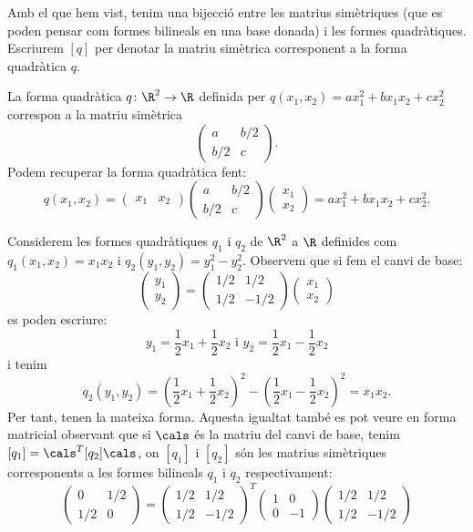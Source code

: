\begin{observacio}
Amb el que hem vist, tenim una bijecció entre les matrius simètriques (que es poden pensar com formes bilineals en una base donada) i les formes quadràtiques. Escriurem $[q]$ per denotar la matriu simètrica corresponent a la forma quadràtica $q$.
\end{observacio}
\begin{exemple}
La forma quadràtica $q\colon \R^2 \to \R$ definida per $q(x_1,x_2)=ax_1^2+bx_1x_2+cx_2^2$ correspon a la matriu simètrica
\[
\begin{pmatrix}
a & b/2 \\ b/2 & c
\end{pmatrix} .
\]
Podem recuperar la forma quadràtica fent:
\[
q(x_1,x_2)=\begin{pmatrix} x_1 & x_2 \end{pmatrix}\begin{pmatrix}
a & b/2 \\ b/2 & c
\end{pmatrix} \begin{pmatrix} x_1 \\ x_2 \end{pmatrix}=ax_1^2 + bx_1x_2+cx_2^2 .
\]
\end{exemple}
\begin{exemple}
Considerem les formes quadràtiques $q_1$ i $q_2$ de $\R^2$ a $\R$ definides com $q_1(x_1,x_2)=x_1x_2$ i $q_2(y_1,y_2)=y_1^2-y_2^2$. Observem que si fem el canvi de base:
\[
\begin{pmatrix} y_1 \\ y_2  \end{pmatrix} =
\begin{pmatrix} 1/2 & 1/2 \\ 1/2 & -1/2 \end{pmatrix}
\begin{pmatrix} x_1 \\ x_2  \end{pmatrix}
\]
es poden escriure:
\[
y_1=\frac12x_1+\frac12x_2 \text{ i } y_2=\frac12x_1-\frac12x_2 
\]
i tenim
\[
q_2(y_1,y_2)=(\frac12x_1+\frac12x_2)^2 - (\frac12x_1-\frac12x_2)^2=x_1x_2 .
\]
Per tant, tenen la mateixa forma. Aquesta igualtat també es pot veure en forma matricial observant que si $\cals$ és la matriu del canvi de base, tenim $[q_1]=\cals^T [q_2] \cals$, on $[q_1]$ i $[q_2]$ són les matrius simètriques corresponents a les formes bilineals $q_1$ i $q_2$ respectivament:
\[
\begin{pmatrix} 0 & 1/2 \\ 1/2 & 0 \end{pmatrix}=
\begin{pmatrix} 1/2 & 1/2 \\ 1/2 & -1/2 \end{pmatrix}^T
\begin{pmatrix} 1 & 0 \\ 0 & -1 \end{pmatrix}
\begin{pmatrix} 1/2 & 1/2 \\ 1/2 & -1/2 \end{pmatrix}
\]
\end{exemple}
